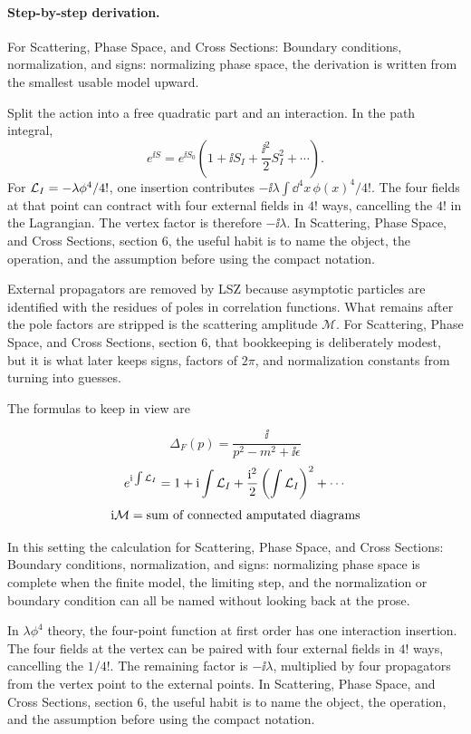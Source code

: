 \paragraph{Step-by-step derivation.}

For Scattering, Phase Space, and Cross Sections: Boundary conditions, normalization, and signs: normalizing phase space, the derivation is written from the smallest usable model upward.

Split the action into a free quadratic part and an interaction.  In the path integral,
\[
  e^{\ii S}=e^{\ii S_0}\left(1+\ii S_I+\frac{\ii^2}{2}S_I^2+\cdots\right).
\]
For \(\mathcal L_I=-\lambda\phi^4/4!\), one insertion contributes \(-\ii\lambda\int\dd^4x\,\phi(x)^4/4!\).  The four fields at that point can contract with four external fields in \(4!\) ways, cancelling the \(4!\) in the Lagrangian.  The vertex factor is therefore \(-\ii\lambda\).  In Scattering, Phase Space, and Cross Sections, section 6, the useful habit is to name the object, the operation, and the assumption before using the compact notation.

External propagators are removed by LSZ because asymptotic particles are identified with the residues of poles in correlation functions.  What remains after the pole factors are stripped is the scattering amplitude \(\mathcal M\).  For Scattering, Phase Space, and Cross Sections, section 6, that bookkeeping is deliberately modest, but it is what later keeps signs, factors of \(2\pi\), and normalization constants from turning into guesses.

The formulas to keep in view are

\[
  \Delta_F(p)=\frac{\ii}{p^2-m^2+\ii\epsilon}
\]
\[
  e^{\mathrm i\int\mathcal L_I}=1+\mathrm i\int\mathcal L_I+\frac{\mathrm i^2}{2}\left(\int\mathcal L_I\right)^2+\cdots
\]
\[
  \mathrm i\mathcal M=\hbox{sum of connected amputated diagrams}
\]

In this setting the calculation for Scattering, Phase Space, and Cross Sections: Boundary conditions, normalization, and signs: normalizing phase space is complete when the finite model, the limiting step, and the normalization or boundary condition can all be named without looking back at the prose.




\begin{example}
In \(\lambda\phi^4\) theory, the four-point function at first order has one interaction insertion.  The four fields at the vertex can be paired with four external fields in \(4!\) ways, cancelling the \(1/4!\).  The remaining factor is \(-\ii\lambda\), multiplied by four propagators from the vertex point to the external points.  In Scattering, Phase Space, and Cross Sections, section 6, the useful habit is to name the object, the operation, and the assumption before using the compact notation.
\end{example}



